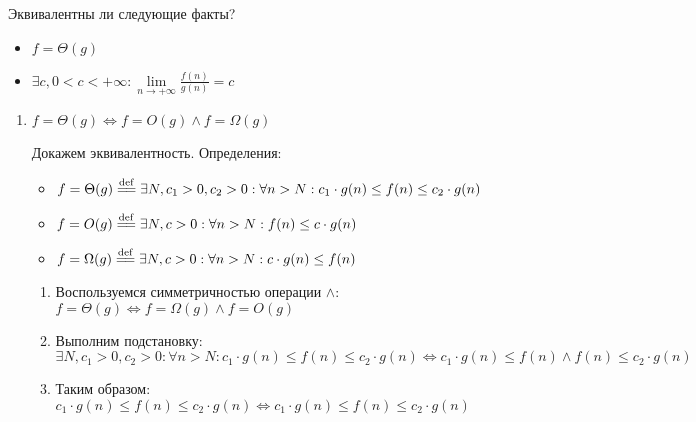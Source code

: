 

\begin{problem}
    Эквивалентны ли следующие факты?
\end{problem}

\begin{itemize}
    \item $f = \Theta(g)$
    \item $\exists c,  0 < c < +\infty : \lim\limits_{n \to +\infty} \frac{f(n)}{g(n)} = c$
\end{itemize}

\begin{solution}
    \leavevmode\vspace{1pt}
    \begin{enumerate}
        \item $f = \Theta(g) \Leftrightarrow f = O(g) \land f = \Omega(g)$

            Докажем эквивалентность. Определения:

            \begin{itemize}
                \item $f = \Theta(g) \defeq \exists N, c_1 > 0, c_2 > 0 : \forall n > N : c_1 \cdot g(n) \le f(n) \le c_2 \cdot g(n)$
                \item $f = O(g) \defeq \exists N, c > 0 : \forall n > N : f(n) \le c \cdot g(n)$
                \item $f = \Omega(g) \defeq \exists N, c > 0 : \forall n > N : c \cdot g(n) \le f(n)$
            \end{itemize}

            \begin{enumerate}
                \item Воспользуемся симметричностью операции $\land$:
                    \hfill \break
                    $f = \Theta(g) \Leftrightarrow f = \Omega(g) \land f = O(g)$

                \item Выполним подстановку:
                    \hfill \break
                    $\exists N, c_1 > 0, c_2 > 0 : \forall n > N : c_1 \cdot g(n) \le f(n) \le c_2 \cdot g(n) \Leftrightarrow c_1 \cdot g(n) \le f(n) \land f(n) \le c_2 \cdot g(n)$

                \item Таким образом:
                    \hfill \break
                    $c_1 \cdot g(n) \le f(n) \le c_2 \cdot g(n) \Leftrightarrow c_1 \cdot g(n) \le f(n) \le c_2 \cdot g(n)$


\end{enumerate}
\end{enumerate}
\end{solution}
